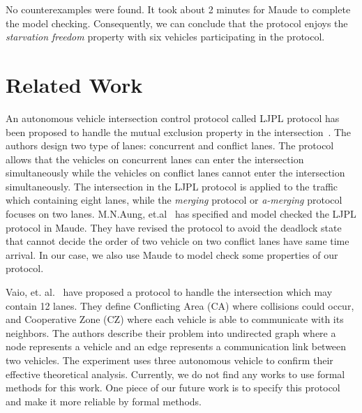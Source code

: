\documentclass[10pt, conference, compsocconf]{IEEEtran}
\begin{document}
\noindent
No counterexamples were found. It took about 2 minutes for Maude to complete the model checking. 
Consequently, we can conclude that the protocol enjoys the \textit{starvation freedom} property with six vehicles participating in the protocol.


 
 
\section{Related Work}
 \label{sect_Relate}
 
 An autonomous vehicle intersection control protocol called LJPL protocol has been proposed to handle the mutual exclusion property in the intersection~\cite{LimJongBeom2018Aedm}.
 The authors design two type of lanes: concurrent and conflict lanes. 
 The protocol allows that the vehicles on concurrent lanes can enter the intersection simultaneously while the vehicles on conflict lanes cannot enter the intersection simultaneously.
 The intersection in the LJPL protocol is applied to the traffic which containing eight lanes, while the \textit{merging} protocol or \textit{a-merging} protocol focuses on two lanes.
 M.N.Aung, et.al~\cite{DBLP:conf/seke/AungP019} has specified and model checked the LJPL protocol in Maude.
 They have revised the protocol to avoid the deadlock state that cannot decide the order of two vehicle on two conflict lanes have same time arrival.
 In our case, we also use Maude to model check some properties of our protocol.
  
 Vaio, et. al.~\cite{8790807} have proposed a protocol to handle the intersection which may contain 12 lanes.
 They define Conflicting Area (CA) where collisions could occur, and Cooperative Zone (CZ) where each vehicle is able to communicate with its neighbors. 
 The authors describe their problem into undirected graph where a node represents a vehicle and an edge represents a communication link between two vehicles.
 The experiment uses three autonomous vehicle to confirm their effective theoretical analysis.
 Currently, we do not find any works to use formal methods for this work.
 One piece of our future work is to specify this protocol and make it more reliable by formal methods.
 
\end{document}
